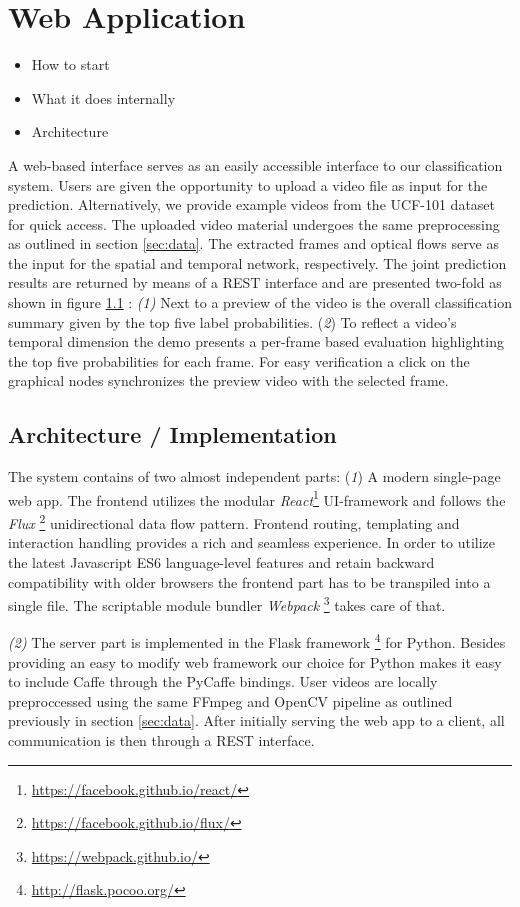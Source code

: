 \section{Web Application}
\label{sec:web}
\begin{itemize}
	\item How to start
	\item What it does internally
	\item Architecture
\end{itemize}

A web-based interface serves as an easily accessible interface to our classification system.
Users are given the opportunity to upload a video file as input for the prediction.
Alternatively, we provide example videos from the UCF-101 dataset for quick access.
The uploaded video material undergoes the same preprocessing as outlined in section \ref{sec:data}.
The extracted frames and optical flows serve as the input for the spatial and temporal network, respectively.
The joint prediction results are returned by means of a REST interface and are presented two-fold as shown in figure \ref{} :
\textit{(1)} Next to a preview of the video is the overall classification summary given by the top five label probabilities.
(\textit{2}) To reflect a video’s temporal dimension the demo presents a per-frame based evaluation highlighting the top five probabilities for each frame.
For easy verification a click on the graphical nodes synchronizes the preview video with the selected frame.

\subsection{Architecture / Implementation}
The system contains of two almost independent parts:
(\textit{1}) A modern single-page web app.
The frontend utilizes the modular \textit{React}\footnote{\url{https://facebook.github.io/react/}} UI-framework and follows the \textit{Flux} \footnote{\url{https://facebook.github.io/flux/}} unidirectional data flow pattern.
Frontend routing, templating and interaction handling provides a rich and seamless experience.
In order to utilize the latest Javascript ES6 language-level features and retain backward compatibility with older browsers the frontend part has to be transpiled into a single file.
The scriptable module bundler \textit{Webpack} \footnote{\url{https://webpack.github.io/}} takes care of that.

\textit{(2)} The server part is implemented in the Flask framework \footnote{\url{http://flask.pocoo.org/}} for Python.
Besides providing an easy to modify web framework our choice for Python makes it easy to include Caffe through the PyCaffe bindings.
User videos are locally preproccessed using the same FFmpeg and OpenCV pipeline as outlined previously in section \ref{sec:data}.
After initially serving the web app to a client, all communication is then through a REST interface.

